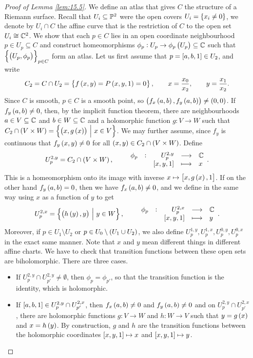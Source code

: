 \pagebreak

\begin{proof}[Proof of Lemma \ref{lem:15.5}]
We define an atlas that gives $ C $ the structure of a Riemann surface. Recall that $ U_i \subseteq \mathbb{P}^2 $ were the open covers $ U_i = \cbr{x_i \ne 0} $, we denote by $ U_i \cap C $ the affine curve that is the restriction of $ C $ to the open set $ U_i \cong \mathbb{C}^2 $. We show that each $ p \in C $ lies in an open coordinate neighbourhood $ p \in U_p \subseteq C $ and construct homeomorphisms $ \phi_p : U_p \to \phi_p\br{U_p} \subseteq \CC $ such that $ \cbr{\br{U_p, \phi_p}}_{p \in C} $ form an atlas. Let us first assume that $ p = \sbr{a, b, 1} \in U_2 $, and write
$$ C_2 = C \cap U_2 = \cbr{f\br{x, y} = P\br{x, y, 1} = 0}, \qquad x = \dfrac{x_0}{x_2}, \qquad y = \dfrac{x_1}{x_2}. $$
Since $ C $ is smooth, $ p \in C $ is a smooth point, so $ \br{f_x\br{a, b}, f_y\br{a, b}} \ne \br{0, 0} $. If $ f_y\br{a, b} \ne 0 $, then, by the implicit function theorem, there are neighbourhoods $ a \in V \subseteq \mathbb{C} $ and $ b \in W \subseteq \mathbb{C} $ and a holomorphic function $ g : V \to W $ such that $ C_2 \cap \br{V \times W} = \cbr{\br{x, g\br{x}} \st x \in V} $. We may further assume, since $ f_y $ is continuous that $ f_y\br{x, y} \ne 0 $ for all $ \br{x, y} \in C_2 \cap \br{V \times W} $. Define
$$ U_p^{2, y} = C_2 \cap \br{V \times W}, \qquad \function[\phi_p]{U_p^{2, y}}{\CC}{\sbr{x, y, 1}}{x}. $$
This is a homeomorphism onto its image with inverse $ x \mapsto \sbr{x, g\br{x}, 1} $. If on the other hand $ f_y\br{a, b} = 0 $, then we have $ f_x\br{a, b} \ne 0 $, and we define in the same way using $ x $ as a function of $ y $ to get
$$ U_p^{2, x} = \cbr{\br{h\br{y}, y} \st y \in W}, \qquad \function[\phi_p]{U_p^{2, x}}{\CC}{\sbr{x, y, 1}}{y}. $$
Moreover, if $ p \in U_1 \setminus U_2 $ or $ p \in U_0 \setminus \br{U_1 \cup U_2} $, we also define $ U_p^{1, y}, U_p^{1, x}, U_p^{0, y}, U_p^{0, x} $ in the exact same manner. Note that $ x $ and $ y $ mean different things in different affine charts. We have to check that transition functions between these open sets are biholomorphic. There are three cases.
\begin{itemize}
\item If $ U_p^{2, y} \cap U_{p'}^{2, y} \ne \emptyset $, then $ \phi_p = \phi_{p'} $, so that the transition function is the identity, which is holomorphic.
\item If $ \sbr{a, b, 1} \in U_p^{2, y} \cap U_{p'}^{2, x} $, then $ f_x\br{a, b} \ne 0 $ and $ f_y\br{a, b} \ne 0 $ and on $ U_p^{2, y} \cap U_{p'}^{2, x} $, there are holomorphic functions $ g : V \to W $ and $ h : W \to V $ such that $ y = g\br{x} $ and $ x = h\br{y} $. By construction, $ g $ and $ h $ are the transition functions between the holomorphic coordinates $ \sbr{x, y, 1} \mapsto x $ and $ \sbr{x, y, 1} \mapsto y $.

\end{itemize}
\end{proof}
